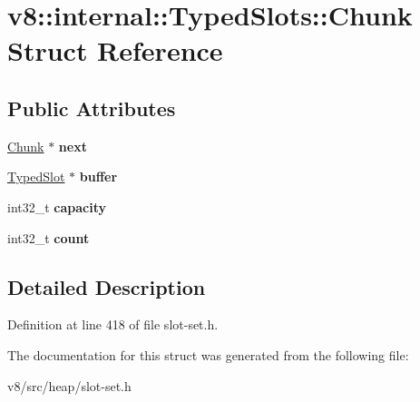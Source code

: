 \hypertarget{structv8_1_1internal_1_1TypedSlots_1_1Chunk}{}\section{v8\+:\+:internal\+:\+:Typed\+Slots\+:\+:Chunk Struct Reference}
\label{structv8_1_1internal_1_1TypedSlots_1_1Chunk}
\subsection*{Public Attributes}
\begin{DoxyCompactItemize}
\item 
\mbox{\label{structv8_1_1internal_1_1TypedSlots_1_1Chunk_a59b5fde9812d4e3507e5bc17ce1f461f}} 
\mbox{\hyperlink{structv8_1_1internal_1_1TypedSlots_1_1Chunk}{Chunk}} $\ast$ {\bfseries next}
\item 
\mbox{\label{structv8_1_1internal_1_1TypedSlots_1_1Chunk_a294e8af43bc48cedfdfd6b36e444b524}} 
\mbox{\hyperlink{structv8_1_1internal_1_1TypedSlots_1_1TypedSlot}{Typed\+Slot}} $\ast$ {\bfseries buffer}
\item 
\mbox{\label{structv8_1_1internal_1_1TypedSlots_1_1Chunk_a40f05f67f00d1bea12b803809cddec1a}} 
int32\+\_\+t {\bfseries capacity}
\item 
\mbox{\label{structv8_1_1internal_1_1TypedSlots_1_1Chunk_af942bde7858b110d3ed1311fcaf86c38}} 
int32\+\_\+t {\bfseries count}
\end{DoxyCompactItemize}


\subsection{Detailed Description}


Definition at line 418 of file slot-\/set.\+h.



The documentation for this struct was generated from the following file\+:\begin{DoxyCompactItemize}
\item 
v8/src/heap/slot-\/set.\+h\end{DoxyCompactItemize}
